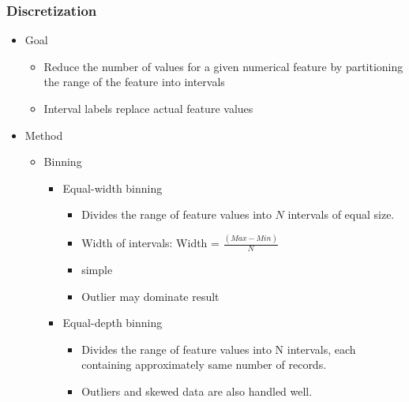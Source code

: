 \documentclass[../notes.tex]{subfiles}
\begin{document}
\subsubsection{Discretization}
\begin{itemize}
  \item Goal
  \begin{itemize}
    \item Reduce the number of values for a given numerical feature by partitioning the range of the feature into intervals
    \item Interval labels replace actual feature values
  \end{itemize}

  \item Method
  \begin{itemize}
    \item Binning
      \begin{itemize}
        \item Equal-width binning
        \begin{itemize}
          \item Divides the range of feature values into $N$ intervals of equal size.
          \item Width of intervals: Width = $\frac{(Max-Min)}{N}$
          \item simple
          \item Outlier may dominate result
        \end{itemize}
        
        \item Equal-depth binning 
        \begin{itemize}
          \item Divides the range of feature values into N intervals, each containing approximately same number of records.
          \item Outliers and skewed data are also handled well.
        \end{itemize}
      \end{itemize}  


\end{itemize}
\end{itemize}
\end{document}
